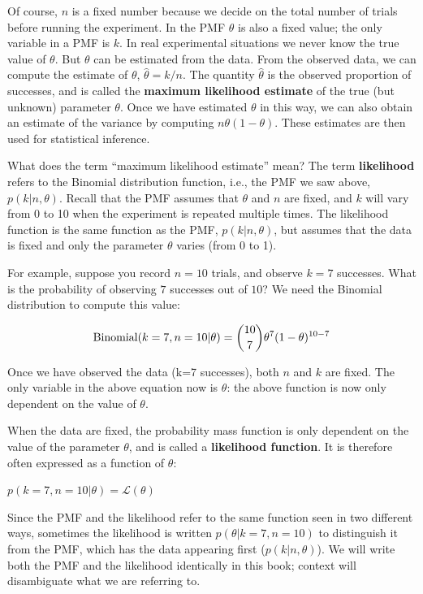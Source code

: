 \documentclass[12pt,]{krantz}
\theoremstyle{definition}
\theoremstyle{definition}
\theoremstyle{definition}
\theoremstyle{remark}
\begin{document}
Of course, \(n\) is a fixed number because we decide on the total number
of trials before running the experiment. In the PMF \(\theta\) is also a
fixed value; the only variable in a PMF is \(k\). In real experimental
situations we never know the true value of \(\theta\). But \(\theta\)
can be estimated from the data. From the observed data, we can compute
the estimate of \(\theta\), \(\hat \theta=k/n\). The quantity
\(\hat \theta\) is the observed proportion of successes, and is called
the \textbf{maximum likelihood estimate} of the true (but unknown)
parameter \(\theta\). Once we have estimated \(\theta\) in this way, we
can also obtain an estimate of the variance by computing
\(n\theta (1-\theta)\). These estimates are then used for statistical
inference.

What does the term ``maximum likelihood estimate'' mean? The term
\textbf{likelihood} refers to the Binomial distribution function, i.e.,
the PMF we saw above, \(p(k|n,\theta)\). Recall that the PMF assumes
that \(\theta\) and \(n\) are fixed, and \(k\) will vary from 0 to 10
when the experiment is repeated multiple times. The likelihood function
is the same function as the PMF, \(p(k|n,\theta)\), but assumes that the
data is fixed and only the parameter \(\theta\) varies (from 0 to 1).

For example, suppose you record \(n=10\) trials, and observe \(k=7\)
successes. What is the probability of observing \(7\) successes out of
\(10\)? We need the Binomial distribution to compute this value:

\begin{equation}
\hbox{Binomial}(k=7,n=10|\theta) = 
\binom{10}{7} \theta^{7} (1-\theta)^{10-7}
\end{equation}

Once we have observed the data (k=7 successes), both \(n\) and \(k\) are
fixed. The only variable in the above equation now is \(\theta\): the
above function is now only dependent on the value of \(\theta\).

When the data are fixed, the probability mass function is only dependent
on the value of the parameter \(\theta\), and is called a
\textbf{likelihood function}. It is therefore often expressed as a
function of \(\theta\):

\(p( k=7, n=10 | \theta) = \mathcal{L}(\theta)\)

Since the PMF and the likelihood refer to the same function seen in two
different ways, sometimes the likelihood is written
\(p(\theta | k=7, n=10)\) to distinguish it from the PMF, which has the
data appearing first (\(p(k|n,\theta)\)). We will write both the PMF and
the likelihood identically in this book; context will disambiguate what
we are referring to.
\end{document}
